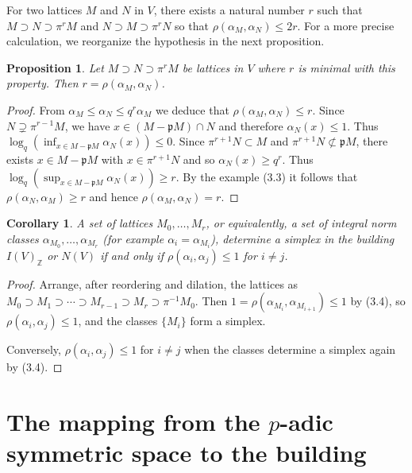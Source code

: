 \documentclass[12pt,a4paper]{article}
\theoremstyle{plain}
\newtheorem{proposition}{Proposition}[section]
\newtheorem{corollary}{Corollary}[section]
\theoremstyle{definition}
\theoremstyle{remark}
\begin{document}
For two lattices $M$ and $N$ in $V$, there exists a natural number $r$ such 
that $M \supset N \supset \pi^r M$ and $N \supset M \supset \pi^r N$ so that 
$\rho(\alpha_M, \alpha_N) \leqslant 2r$. For a more precise calculation, we 
reorganize the hypothesis in the next proposition.

\begin{proposition}
Let $M \supset N \supset \pi^r M$ be lattices in $V$ where $r$ is minimal with 
this property. Then $r = \rho(\alpha_M, \alpha_N)$.
\end{proposition}

\begin{proof}
From $\alpha_M \leqslant \alpha_N \leqslant q^r\alpha_M$ we deduce that 
$\rho(\alpha_M, \alpha_N) \leqslant r$. Since $N \supsetneq \pi^{r-1}M$, we have 
$x \in (M - \mathfrak{p}M) \cap N$ and therefore $\alpha_N(x) \leqslant 1$. Thus 
$\log_q(\inf_{x \in M-\mathfrak{p}M} \alpha_N(x)) \leqslant 0$. Since 
$\pi^{r+1}N \subset M$ and $\pi^{r+1}N \not\subset \mathfrak{p}M$, there exists 
$x \in M - \mathfrak{p}M$ with $x \in \pi^{r+1}N$ and so $\alpha_N(x) \geqslant q^r$. 
Thus $\log_q(\sup_{x \in M-\mathfrak{p}M} \alpha_N(x)) \geqslant r$. By the example 
(3.3) it follows that $\rho(\alpha_N, \alpha_M) \geqslant r$ and hence 
$\rho(\alpha_M, \alpha_N) = r$.
\end{proof}

\begin{corollary}
A set of lattices $M_0, \ldots, M_r$, or equivalently, a set of integral 
norm classes $\alpha_{M_0}, \ldots, \alpha_{M_r}$ (for example 
$\alpha_i = \alpha_{M_i}$), determine a simplex in the building 
$I(V)_\mathbb{Z}$ or $N(V)$ if and only if $\rho(\alpha_i, \alpha_j) \leqslant 1$ 
for $i \neq j$.
\end{corollary}

\begin{proof}
Arrange, after reordering and dilation, the lattices as 
$M_0 \supset M_1 \supset \cdots \supset M_{r-1} \supset M_r \supset \pi^{-1} M_0$. Then 
$1 = \rho(\alpha_{M_i}, \alpha_{M_{i+1}}) \leqslant 1$ by (3.4), so 
$\rho(\alpha_i, \alpha_j) \leqslant 1$, and the classes $\{M_i\}$ form a simplex.

Conversely, $\rho(\alpha_i, \alpha_j) \leqslant 1$ for $i \neq j$ when the 
classes determine a simplex again by (3.4).
\end{proof}


\section{The mapping from the $p$-adic symmetric space to the building}
\end{document}
